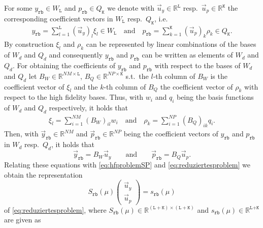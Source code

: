 \documentclass{article}
\theoremstyle{plain}
\theoremstyle{definition}
\theoremstyle{remark}
\newcommand{\RR}{\mathbb{R}}
\begin{document}
For some $y_\texttt{rb} \in W_\texttt{L}$ and $p_\texttt{rb} \in Q_\texttt{K}$ we denote with $\Vec{u}_y \in \RR^{\texttt{L}}$ resp.~$\Vec{u}_p \in \RR^{\texttt{K}}$ the corresponding coefficient vectors in $W_\texttt{L}$ resp.~$Q_\texttt{K}$, i.e.
\begin{align}\label{eq:redsolyp}
    y_\texttt{rb} = \sum_{l=1}^{\texttt{L}} (\Vec{u}_y)_l \xi_l \in W_\texttt{L} \quad \text{and} \quad p_\texttt{rb} = \sum_{k=1}^{\texttt{K}} (\Vec{u}_p)_k \rho_k \in Q_\texttt{K} .
\end{align}
By construction $\xi_l$ and $\rho_k$ can be represented by linear combinations of the bases of $W_d$ and $Q_d$ and consequently $y_\texttt{rb}$ and $p_\texttt{rb}$ can be written as elements of $W_d$ and $Q_d$. For obtaining the coefficients of $y_\texttt{rb}$ and $p_\texttt{rb}$ with respect to the bases of $W_d$ and $Q_d$ let $B_W \in \mathbb{R}^{NM \times \texttt{L}}$, $B_Q \in \mathbb{R}^{NP \times \texttt{K}}$ s.t.~the $l$-th column of $B_W$ is the coefficient vector of $\xi_{l}$ and the $k$-th column of $B_Q$ the coefficient vector of $\rho_{k}$ with respect to the high fidelity bases. Thus, with $w_i$ and $q_i$ being the basis functions of $W_d$ and $Q_d$ respectively, it holds that
\begin{align}
    \xi_l = \sum_{i=1}^{NM}(B_W)_{il}w_i \quad \text{and} \quad \rho_k = \sum_{i=1}^{NP}(B_Q)_{ik}q_i .
\end{align}
Then, with $\Vec{y}_\texttt{rb} \in \RR^{NM}$ and $\Vec{p}_\texttt{rb} \in \RR^{NP}$ being the coefficient vectors of $y_\texttt{rb}$ and $p_\texttt{rb}$ in $W_d$ resp.~$Q_d$, it holds that
\begin{equation}\label{eq:reconstrHFspace}
    \Vec{y}_\texttt{rb} = B_W \Vec{u}_y \qquad \text{and} \qquad \Vec{p}_\texttt{rb} = B_Q \Vec{u}_p .
\end{equation}
Relating these equations with \eqref{eq:hfproblemSP} and \eqref{eq:reduziertesproblem} we obtain the representation \begin{equation}\label{eq:linproblemreduced}
    S_\texttt{rb}(\mu) \begin{pmatrix} \Vec{u}_y\\ \Vec{u}_p\end{pmatrix} = s_\texttt{rb}(\mu)
\end{equation}
of \eqref{eq:reduziertesproblem}, where $S_\texttt{rb}(\mu) \in \RR^{(\texttt{L}+\texttt{K}) \times (\texttt{L}+\texttt{K})}$ 
and $s_\texttt{rb}(\mu) \in \RR^{\texttt{L}+\texttt{K}}$ are given as
\end{document}
